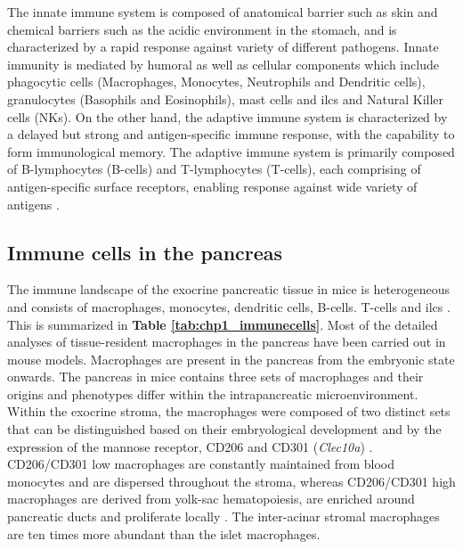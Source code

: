 \par The innate immune system is composed of anatomical barrier such as skin and chemical barriers such as the acidic environment in the stomach, and is characterized by a rapid response against variety of different pathogens. Innate immunity is mediated by humoral as well as cellular components which include phagocytic cells (Macrophages, Monocytes, Neutrophils and Dendritic cells), granulocytes (Basophils and Eosinophils), mast cells and \glspl{ilc} and Natural Killer cells (NKs). On the other hand, the adaptive immune system is characterized by a delayed but strong and antigen-specific immune response, with the capability to form immunological memory. The adaptive immune system is primarily composed of B-lymphocytes (B-cells) and T-lymphocytes (T-cells), each comprising of antigen-specific surface receptors, enabling response against wide variety of antigens \textbf{\cite{murphy_janeways_2017,chaplin_overview_2010,marshall_introduction_2018}}.\\



\subsection{Immune cells in the pancreas}

The immune landscape of the exocrine pancreatic tissue in mice is heterogeneous and consists of macrophages, monocytes, dendritic cells, B-cells. T-cells and \glspl{ilc} \textbf{\cite{calderon_pancreas_2015}}. This is summarized in \textbf{Table \ref{tab:chp1_immunecells}}. Most of the detailed analyses of tissue-resident macrophages in the pancreas have been carried out in mouse models. Macrophages are present in the pancreas from the embryonic state onwards. The pancreas in mice contains three sets of macrophages and their origins and phenotypes differ within the intrapancreatic microenvironment. Within the exocrine stroma, the macrophages were composed of two distinct sets that can be distinguished based on their embryological development and by the expression of the mannose receptor, CD206 and CD301 (\textit{Clec10a}) \textbf{\cite{calderon_pancreas_2015,cruz_macrophages_2020}}. CD206/CD301 low macrophages are constantly maintained from blood monocytes and are dispersed throughout the stroma, whereas CD206/CD301 high macrophages are derived from yolk-sac hematopoiesis, are enriched around pancreatic ducts and proliferate locally \textbf{\cite{calderon_pancreas_2015,cruz_macrophages_2020}}. The inter-acinar stromal macrophages are ten times more abundant than the islet macrophages.\\

